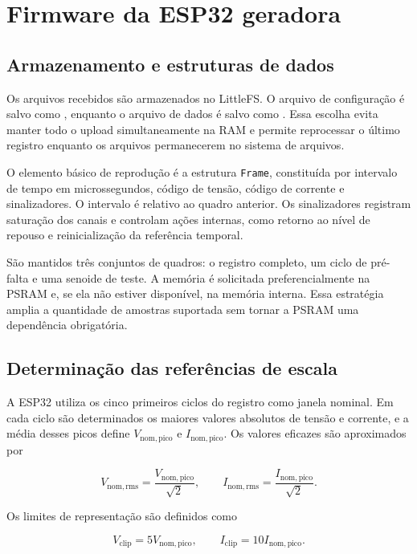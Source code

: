 \section{Firmware da ESP32 geradora}

\subsection{Armazenamento e estruturas de dados}

Os arquivos recebidos são armazenados no LittleFS. O arquivo de configuração é salvo como , enquanto o arquivo de dados é salvo como . Essa escolha evita manter todo o upload simultaneamente na RAM e permite reprocessar o último registro enquanto os arquivos permanecerem no sistema de arquivos.

O elemento básico de reprodução é a estrutura \texttt{Frame}, constituída por intervalo de tempo em microssegundos, código de tensão, código de corrente e sinalizadores. O intervalo é relativo ao quadro anterior. Os sinalizadores registram saturação dos canais e controlam ações internas, como retorno ao nível de repouso e reinicialização da referência temporal.

São mantidos três conjuntos de quadros: o registro completo, um ciclo de pré-falta e uma senoide de teste. A memória é solicitada preferencialmente na PSRAM e, se ela não estiver disponível, na memória interna. Essa estratégia amplia a quantidade de amostras suportada sem tornar a PSRAM uma dependência obrigatória.

\subsection{Determinação das referências de escala}

A ESP32 utiliza os cinco primeiros ciclos do registro como janela nominal. Em cada ciclo são determinados os maiores valores absolutos de tensão e corrente, e a média desses picos define $V_{\mathrm{nom,pico}}$ e $I_{\mathrm{nom,pico}}$. Os valores eficazes são aproximados por

\begin{equation}
  V_{\mathrm{nom,rms}}=\frac{V_{\mathrm{nom,pico}}}{\sqrt{2}}, \qquad
  I_{\mathrm{nom,rms}}=\frac{I_{\mathrm{nom,pico}}}{\sqrt{2}}.
\end{equation}

Os limites de representação são definidos como

\begin{equation}
  V_{\mathrm{clip}}=5V_{\mathrm{nom,pico}}, \qquad
  I_{\mathrm{clip}}=10I_{\mathrm{nom,pico}}.
  \label{eq:limites-dac}
\end{equation}

